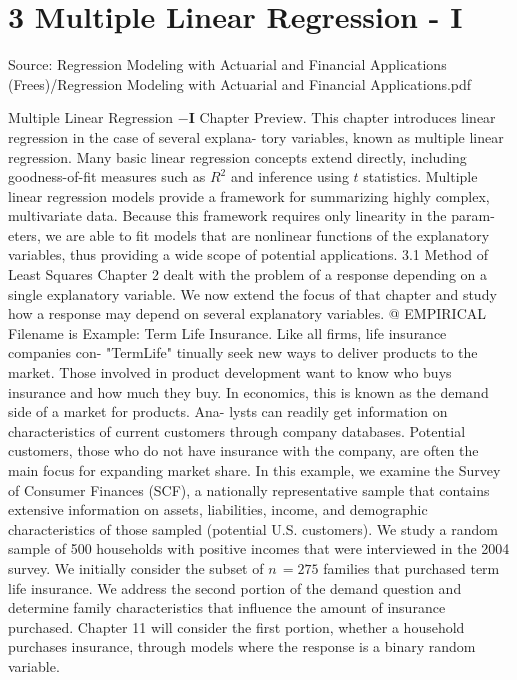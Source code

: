 \documentclass[11pt]{article}
\begin{document}
\section*{3 Multiple Linear Regression - I}
{\small Source: Regression Modeling with Actuarial and Financial Applications (Frees)/Regression Modeling with Actuarial and Financial Applications.pdf\par}
 Multiple Linear Regression \(- \mathbf{I}\)
 Chapter Preview. This chapter introduces linear regression in the case of several explana-
 tory variables, known as multiple linear regression. Many basic linear regression concepts
extend directly, including goodness-of-fit measures such as \(R^{2}\) and inference using \(t\)
 statistics. Multiple linear regression models provide a framework for summarizing highly
complex, multivariate data. Because this framework requires only linearity in the param-
eters, we are able to fit models that are nonlinear functions of the explanatory variables,
 thus providing a wide scope of potential applications.
 3.1 Method of Least Squares
 Chapter 2 dealt with the problem of a response depending on a single explanatory
variable. We now extend the focus of that chapter and study how a response may
 depend on several explanatory variables.
@ EMPIRICAL
Filename is Example: Term Life Insurance. Like all firms, life insurance companies con-
"TermLife" tinually seek new ways to deliver products to the market. Those involved in
 product development want to know who buys insurance and how much they buy.
In economics, this is known as the demand side of a market for products. Ana-
lysts can readily get information on characteristics of current customers through
company databases. Potential customers, those who do not have insurance with
 the company, are often the main focus for expanding market share.
In this example, we examine the Survey of Consumer Finances (SCF), a
nationally representative sample that contains extensive information on assets,
liabilities, income, and demographic characteristics of those sampled (potential
U.S. customers). We study a random sample of 500 households with positive
incomes that were interviewed in the 2004 survey. We initially consider the
subset of \(n \,=2 7 5\) families that purchased term life insurance. We address the
second portion of the demand question and determine family characteristics that
influence the amount of insurance purchased. Chapter 11 will consider the first
portion, whether a household purchases insurance, through models where the
 response is a binary random variable.
\end{document}
